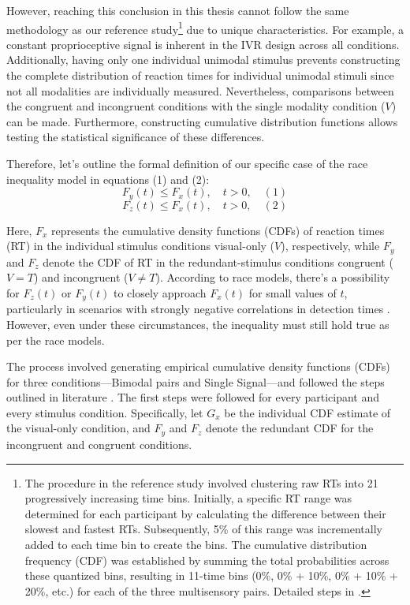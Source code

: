 \documentclass[12pt,oneside,openright]{report}
\begin{document}
However, reaching this conclusion in this thesis cannot follow the same methodology as our reference study\footnote{The procedure in the reference study involved clustering raw RTs into 21 progressively increasing time bins. Initially, a specific RT range was determined for each participant by calculating the difference between their slowest and fastest RTs. Subsequently, 5\% of this range was incrementally added to each time bin to create the bins. The cumulative distribution frequency (CDF) was established by summing the total probabilities across these quantized bins, resulting in 11-time bins (0\%, 0\% + 10\%, 0\% + 10\% + 20\%, etc.) for each of the three multisensory pairs. Detailed steps in \textcite{Mahoney2019-yq}.} due to unique characteristics. For example, a constant proprioceptive signal is inherent in the IVR design across all conditions. Additionally, having only one individual unimodal stimulus prevents constructing the complete distribution of reaction times for individual unimodal stimuli since not all modalities are individually measured. Nevertheless, comparisons between the congruent and incongruent conditions with the single modality condition ($V$) can be made. Furthermore, constructing cumulative distribution functions allows testing the statistical significance of these differences.

Therefore, let's outline the formal definition of our specific case of the race inequality model in equations (1) and (2):
\[
F_y(t) \leq F_x(t), \quad t > 0, \quad (1)
\]
\[
F_z(t) \leq F_x(t), \quad t > 0, \quad (2)
\]

Here, $F_x$ represents the cumulative density functions (CDFs) of reaction times (RT) in the individual stimulus conditions visual-only ($V$), respectively, while $F_y$ and $F_z$ denote the CDF of RT in the redundant-stimulus conditions congruent ($V=T$) and incongruent ($V \neq T$). According to race models, there's a possibility for $F_z(t)$ or $F_y(t)$ to closely approach $F_x(t)$ for small values of $t$, particularly in scenarios with strongly negative correlations in detection times \parencite*{Ulrich2007}. However, even under these circumstances, the inequality must still hold true as per the race models.

The process involved generating empirical cumulative density functions (CDFs) for three conditions—Bimodal pairs and Single Signal—and followed the steps outlined in literature \parencite*{Ulrich2007}. The first steps were followed for every participant and every stimulus condition. Specifically, let $G_x$ be the individual CDF estimate of the visual-only condition, and $F_y$ and $F_z$ denote the redundant CDF for the incongruent and congruent conditions.
\end{document}

